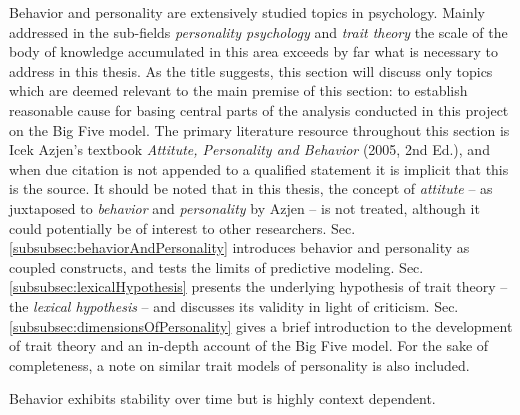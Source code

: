 Behavior and personality are extensively studied topics in psychology. Mainly addressed in the sub-fields \textit{personality psychology} and \textit{trait theory} the scale of the body of knowledge accumulated in this area exceeds by far what is necessary to address in this thesis. As the title suggests, this section will discuss only topics which are deemed relevant to the main premise of this section: to establish reasonable cause for basing central parts of the analysis conducted in this project on the Big Five model. The primary literature resource throughout this section is Icek Azjen's textbook \textit{Attitute, Personality and Behavior} (2005, 2nd Ed.), and when due citation is not appended to a qualified statement it is implicit that this is the source. It should be noted that in this thesis, the concept of \textit{attitute} -- as juxtaposed to \textit{behavior} and \textit{personality} by Azjen -- is not treated, although it could potentially be of interest to other researchers. Sec. \ref{subsubsec:behaviorAndPersonality} introduces behavior and personality as coupled constructs, and tests the limits of predictive modeling. Sec. \ref{subsubsec:lexicalHypothesis} presents the underlying hypothesis of trait theory -- the \textit{lexical hypothesis} -- and discusses its validity in light of criticism. Sec. \ref{subsubsec:dimensionsOfPersonality} gives a brief introduction to the development of trait theory and an in-depth account of the Big Five model. For the sake of completeness, a note on similar trait models of personality is also included.

Behavior exhibits stability over time but is highly context dependent.